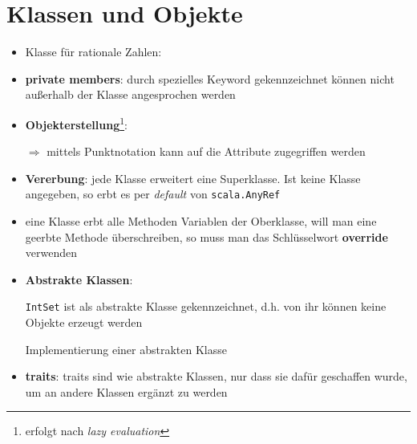 \section{Klassen und Objekte}
\begin{itemize}
  \item Klasse für rationale Zahlen:
  
  
  
  \item \textbf{private members}: durch spezielles Keyword gekennzeichnet
  \und können nicht außerhalb der Klasse angesprochen werden
  \item \textbf{Objekterstellung}\footnote{erfolgt nach 
  \textit{lazy evaluation}}:
  
  
  
  
  $\Rightarrow$ mittels Punktnotation kann auf die Attribute zugegriffen
  werden
  \item \textbf{Vererbung}: jede Klasse erweitert eine Superklasse. Ist
  keine Klasse angegeben, so erbt es per \textit{default} von
  \texttt{scala.AnyRef}
  
  
  
  \item eine Klasse erbt alle Methoden \und Variablen der Oberklasse, will
  man eine geerbte Methode überschreiben, so muss man das Schlüsselwort
  \textbf{override} verwenden
  
  
    
  \item \textbf{Abstrakte Klassen}: 
  
  
  
  \texttt{IntSet} ist als abstrakte Klasse gekennzeichnet, d.h. von ihr können
  keine Objekte erzeugt werden
  
  Implementierung einer abstrakten Klasse
  
  
  
  \item \textbf{traits}: traits sind wie abstrakte Klassen, nur dass sie
  dafür geschaffen wurde, um an andere Klassen ergänzt zu werden
  

\end{itemize}
